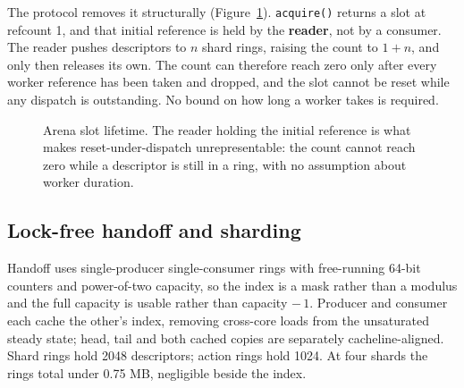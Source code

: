 \documentclass[conference]{IEEEtran}
\begin{document}
The protocol removes it structurally (Figure~\ref{fig:arena}). \texttt{acquire()} returns a
slot at refcount 1, and that initial reference is held by the \textbf{reader}, not by a
consumer. The reader pushes descriptors to $n$ shard rings, raising the count to $1 + n$, and
only then releases its own. The count can therefore reach zero only after every worker
reference has been taken and dropped, and the slot cannot be reset while any dispatch is
outstanding. No bound on how long a worker takes is required.

\begin{figure}[t]
\centering
{}
\caption{Arena slot lifetime. The reader holding the initial reference is what makes
reset-under-dispatch unrepresentable: the count cannot reach zero while a descriptor is still
in a ring, with no assumption about worker duration.}
\label{fig:arena}
\end{figure}

\subsection{Lock-free handoff and sharding}

Handoff uses single-producer single-consumer rings with free-running 64-bit counters and
power-of-two capacity, so the index is a mask rather than a modulus and the full capacity is
usable rather than capacity $-\,1$. Producer and consumer each cache the other's index,
removing cross-core loads from the unsaturated steady state; head, tail and both cached copies
are separately cacheline-aligned. Shard rings hold 2048 descriptors; action rings hold 1024. At
four shards the rings total under 0.75 MB, negligible beside the index.
\end{document}
